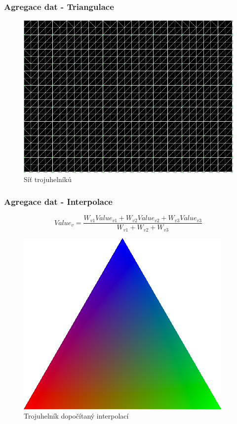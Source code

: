 \documentclass{beamer}
\begin{document}
	\begin{frame}
		\frametitle{Agregace dat - Triangulace}
		
		\begin{figure}
			
			\includegraphics[scale=0.5]{figures/bmp_sit.png}
			\caption{Síť trojuhelníků}
			
		\end{figure}
		
	\end{frame}
	
	\begin{frame}
		\frametitle{Agregace dat - Interpolace}
		
		\begin{displaymath}
			Value_v = \frac{W_{v1}Value_{v1} + W_{v2}Value_{v2} + W_{v3}Value_{v3}}{W_{v1} + W_{v2} + W_{v3}}
		\end{displaymath}
		
		\begin{figure}
			
			\includegraphics[scale=0.25]{figures/interpolace_trojuhelnik.jpg}
			\caption{Trojuhelník dopočítaný interpolací \cite{coltrian}}
			
		\end{figure}
		
	\end{frame}
	
\end{document}
